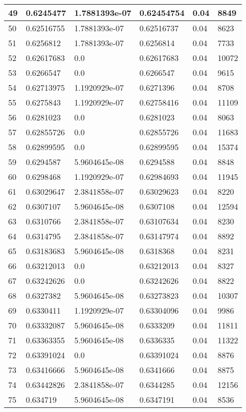 \begin{longtable}{|l|l|l|l|l|l|}
49 & 0.6245477 & 1.7881393e-07 & 0.62454754 & 0.04 & 8849 \\ \hline 
50 & 0.62516755 & 1.7881393e-07 & 0.62516737 & 0.04 & 8623 \\ \hline 
51 & 0.6256812 & 1.7881393e-07 & 0.6256814 & 0.04 & 7733 \\ \hline 
52 & 0.62617683 & 0.0 & 0.62617683 & 0.04 & 10072 \\ \hline 
53 & 0.6266547 & 0.0 & 0.6266547 & 0.04 & 9615 \\ \hline 
54 & 0.62713975 & 1.1920929e-07 & 0.6271396 & 0.04 & 8708 \\ \hline 
55 & 0.6275843 & 1.1920929e-07 & 0.62758416 & 0.04 & 11109 \\ \hline 
56 & 0.6281023 & 0.0 & 0.6281023 & 0.04 & 8063 \\ \hline 
57 & 0.62855726 & 0.0 & 0.62855726 & 0.04 & 11683 \\ \hline 
58 & 0.62899595 & 0.0 & 0.62899595 & 0.04 & 15374 \\ \hline 
59 & 0.6294587 & 5.9604645e-08 & 0.6294588 & 0.04 & 8848 \\ \hline 
60 & 0.6298468 & 1.1920929e-07 & 0.62984693 & 0.04 & 11945 \\ \hline 
61 & 0.63029647 & 2.3841858e-07 & 0.63029623 & 0.04 & 8220 \\ \hline 
62 & 0.6307107 & 5.9604645e-08 & 0.6307108 & 0.04 & 12594 \\ \hline 
63 & 0.6310766 & 2.3841858e-07 & 0.63107634 & 0.04 & 8230 \\ \hline 
64 & 0.6314795 & 2.3841858e-07 & 0.63147974 & 0.04 & 8892 \\ \hline 
65 & 0.63183683 & 5.9604645e-08 & 0.6318368 & 0.04 & 8231 \\ \hline 
66 & 0.63212013 & 0.0 & 0.63212013 & 0.04 & 8327 \\ \hline 
67 & 0.63242626 & 0.0 & 0.63242626 & 0.04 & 8822 \\ \hline 
68 & 0.6327382 & 5.9604645e-08 & 0.63273823 & 0.04 & 10307 \\ \hline 
69 & 0.6330411 & 1.1920929e-07 & 0.63304096 & 0.04 & 9986 \\ \hline 
70 & 0.63332087 & 5.9604645e-08 & 0.6333209 & 0.04 & 11811 \\ \hline 
71 & 0.63363355 & 5.9604645e-08 & 0.6336335 & 0.04 & 11322 \\ \hline 
72 & 0.63391024 & 0.0 & 0.63391024 & 0.04 & 8876 \\ \hline 
73 & 0.63416666 & 5.9604645e-08 & 0.6341666 & 0.04 & 8875 \\ \hline 
74 & 0.63442826 & 2.3841858e-07 & 0.6344285 & 0.04 & 12156 \\ \hline 
75 & 0.634719 & 5.9604645e-08 & 0.6347191 & 0.04 & 8536 \\ \hline 
\end{longtable}